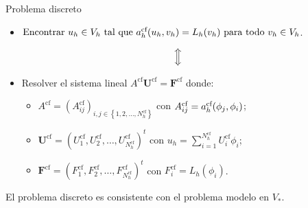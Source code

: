 \begin{frame}{Problema discreto}
	\begin{itemize}
		\item $\text{Encontrar }u_h\in V_h\text{ tal que }a_h^{\text{cf}}(u_h,v_h)=L_h(v_h)\text{ para todo }v_h\in V_h$.
	\end{itemize}
	\vspace*{0.1cm}
	$$\Big{\Updownarrow}$$
	\vspace*{-0.3cm}
	\begin{itemize}
		\item Resolver el sistema lineal $A^{\text{cf}}\mathbf{U}^{\text{cf}}=\mathbf{F}^{\text{cf}}$ donde:
		\vspace*{0.3cm}
		\begin{itemize}
			\item $A^{\text{cf}}=\left(A_{ij}^{\text{cf}}\right)_{i,j\in\left\{1,2,\ldots,N_h^{\text{cf}}\right\}}$ con $A_{ij}^{\text{cf}}=a_h^{\text{cf}}(\phi_j,\phi_i)$;
			\item $\mathbf{U}^{\text{cf}}=\left(U_1^{\text{cf}},U_2^{\text{cf}},\ldots,U_{N_h^{\text{cf}}}^{\text{cf}}\right)^t$ con $u_h=\displaystyle\sum_{i=1}^{N_h^{\text{cf}}}U_i^{\text{cf}}\phi_i$;
			\item $\mathbf{F}^{\text{cf}}=\left(F_1^{\text{cf}},F_2^{\text{cf}},\ldots,F_{N_h^{\text{cf}}}^{\text{cf}}\right)^t$ con $F_i^{\text{cf}}=L_h(\phi_i)$.
		\end{itemize}
	\end{itemize}
	
	\vspace*{0.3cm}
	El problema discreto es consistente con el problema modelo en $V_*$.
	
	\end{frame}
	
